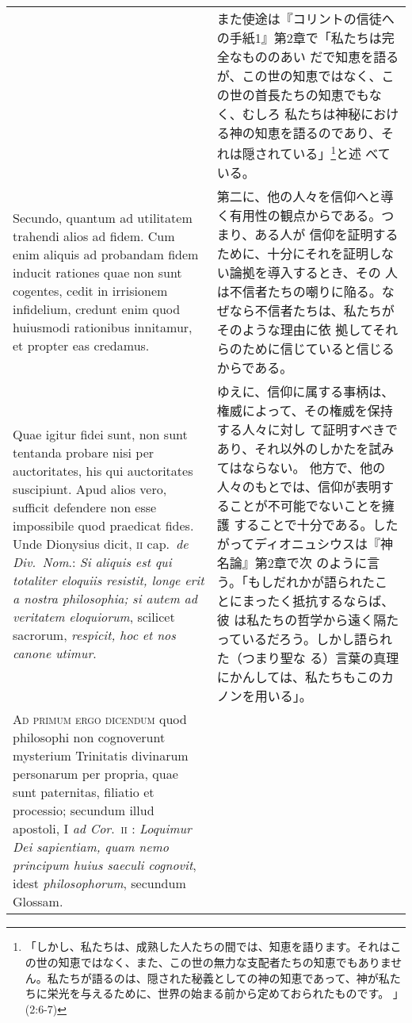 \documentclass[10pt]{jsarticle} %
\begin{document}
\begin{longtable}{p{21em}p{21em}}
&

また使途は『コリントの信徒への手紙1』第2章で「私たちは完全なもののあい
 だで知恵を語るが、この世の知恵ではなく、この世の首長たちの知恵でもなく、むしろ
 私たちは神秘における神の知恵を語るのであり、それは隠されている」\footnote{「しかし、私たちは、成熟した人たちの間では、知恵を語ります。それはこの世の知恵ではなく、また、この世の無力な支配者たちの知恵でもありません。私たちが語るのは、隠された秘義としての神の知恵であって、神が私たちに栄光を与えるために、世界の始まる前から定めておられたものです。 」(2:6-7)}と述
 べている。

\\

Secundo,
quantum ad utilitatem trahendi alios ad fidem. Cum enim aliquis ad
probandam fidem inducit rationes quae non sunt cogentes, cedit in
irrisionem infidelium, credunt enim quod huiusmodi rationibus
innitamur, et propter eas credamus. 


&

第二に、他の人々を信仰へと導く有用性の観点からである。つまり、ある人が
 信仰を証明するために、十分にそれを証明しない論拠を導入するとき、その
 人は不信者たちの嘲りに陥る。なぜなら不信者たちは、私たちがそのような理由に依
 拠してそれらのために信じていると信じるからである。


\\


Quae igitur fidei sunt, non sunt
tentanda probare nisi per auctoritates, his qui auctoritates
suscipiunt. Apud alios vero, sufficit defendere non esse impossibile
quod praedicat fides. Unde Dionysius dicit, {\scshape ii} cap.~{\itshape de Div.~Nom}.: {\itshape Si
aliquis est qui totaliter eloquiis resistit, longe erit a nostra
philosophia; si autem ad veritatem eloquiorum}, scilicet sacrorum,
{\itshape respicit, hoc et nos canone utimur}.


&

ゆえに、信仰に属する事柄は、権威によって、その権威を保持する人々に対し
 て証明すべきであり、それ以外のしかたを試みてはならない。
他方で、他の人々のもとでは、信仰が表明することが不可能でないことを擁護
 することで十分である。したがってディオニュシウスは『神名論』第2章で次
 のように言う。「もしだれかが語られたことにまったく抵抗するならば、彼
 は私たちの哲学から遠く隔たっているだろう。しかし語られた（つまり聖な
 る）言葉の真理にかんしては、私たちもこのカノンを用いる」。


\\



{\scshape Ad primum ergo dicendum} quod philosophi non cognoverunt mysterium
Trinitatis divinarum personarum per propria, quae sunt paternitas,
filiatio et processio; secundum illud apostoli, I {\itshape ad
 Cor}.~{\scshape ii} : {\itshape Loquimur
Dei sapientiam, quam nemo principum huius saeculi cognovit}, idest
{\itshape philosophorum}, secundum Glossam. 


\end{longtable}
\end{document}
